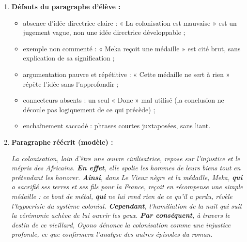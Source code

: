 \documentclass[11pt]{article}
\begin{document}
\begin{corrige}
\begin{enumerate}
\item \textbf{Défauts du paragraphe d'élève :}
\begin{itemize}
\item absence d'idée directrice claire : « La colonisation est mauvaise » est un jugement vague, non une idée directrice développable ;
\item exemple non commenté : « Meka reçoit une médaille » est cité brut, sans explication de sa signification ;
\item argumentation pauvre et répétitive : « Cette médaille ne sert à rien » répète l'idée sans l'approfondir ;
\item connecteurs absents : un seul « Donc » mal utilisé (la conclusion ne découle pas logiquement de ce qui précède) ;
\item enchaînement saccadé : phrases courtes juxtaposées, sans liant.
\end{itemize}
\item \textbf{Paragraphe réécrit (modèle) :}

\emph{La colonisation, loin d'être une œuvre civilisatrice, repose sur l'injustice et le mépris des Africains. \textbf{En effet}, elle spolie les hommes de leurs biens tout en prétendant les honorer. \textbf{Ainsi}, dans \emph{Le Vieux nègre et la médaille}, Meka, \textbf{qui} a sacrifié ses terres et ses fils pour la France, reçoit en récompense une simple médaille : ce bout de métal, \textbf{qui} ne lui rend rien de ce qu'il a perdu, révèle l'hypocrisie du système colonial. \textbf{Cependant}, l'humiliation de la nuit qui suit la cérémonie achève de lui ouvrir les yeux. \textbf{Par conséquent}, à travers le destin de ce vieillard, Oyono dénonce la colonisation comme une injustice profonde, ce que confirmera l'analyse des autres épisodes du roman.}


\end{enumerate}
\end{corrige}
\end{document}
